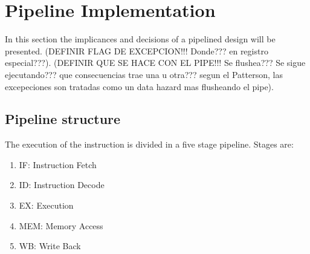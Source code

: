 \section{Pipeline Implementation}

In this section the implicances and decisions of a pipelined design will be presented.
(DEFINIR FLAG DE EXCEPCION!!! Donde??? en registro especial???). 
(DEFINIR QUE SE HACE CON EL PIPE!!! Se flushea??? Se sigue ejecutando??? que consecuencias trae una u otra??? segun el Patterson, las
excepeciones son tratadas como un data hazard mas flusheando el pipe).

\subsection{Pipeline structure}
The execution of the instruction is divided in a five stage pipeline. Stages are:

\begin{enumerate}
 \item IF: Instruction Fetch
 \item ID: Instruction Decode
 \item EX: Execution
 \item MEM: Memory Access
 \item WB: Write Back
\end{enumerate}